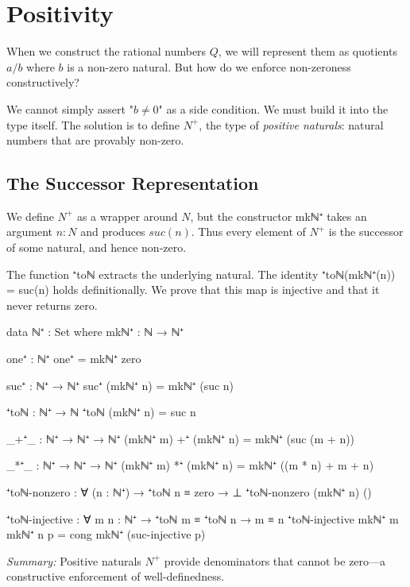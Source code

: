 \documentclass[11pt,a4paper]{book}
\def\mathrm#1{#1}%
\def\mathbb#1{#1}%
\def\texttt#1{#1}%
\begin{document}
\chapter{Positivity}

When we construct the rational numbers $\mathbb{Q}$, we will represent them as 
quotients $a/b$ where $b$ is a non-zero natural. But how do we enforce non-zeroness 
constructively?

We cannot simply assert "$b \ne 0$" as a side condition. We must build it into the 
type itself. The solution is to define $\mathbb{N}^+$, the type of \emph{positive naturals}: 
natural numbers that are provably non-zero.

\section{The Successor Representation}

We define $\mathbb{N}^+$ as a wrapper around $\mathbb{N}$, but the constructor \texttt{mkℕ⁺} 
takes an argument $n : \mathbb{N}$ and produces $\mathrm{suc}(n)$. Thus every element 
of $\mathbb{N}^+$ is the successor of some natural, and hence non-zero.

The function \texttt{⁺toℕ} extracts the underlying natural. The identity \texttt{⁺toℕ(mkℕ⁺(n)) = suc(n)} 
holds definitionally. We prove that this map is injective and that it never returns zero.

\begin{code}
data ℕ⁺ : Set where
  mkℕ⁺ : ℕ → ℕ⁺

one⁺ : ℕ⁺
one⁺ = mkℕ⁺ zero

suc⁺ : ℕ⁺ → ℕ⁺
suc⁺ (mkℕ⁺ n) = mkℕ⁺ (suc n)

⁺toℕ : ℕ⁺ → ℕ
⁺toℕ (mkℕ⁺ n) = suc n

_+⁺_ : ℕ⁺ → ℕ⁺ → ℕ⁺
(mkℕ⁺ m) +⁺ (mkℕ⁺ n) = mkℕ⁺ (suc (m + n))

_*⁺_ : ℕ⁺ → ℕ⁺ → ℕ⁺
(mkℕ⁺ m) *⁺ (mkℕ⁺ n) = mkℕ⁺ ((m * n) + m + n)
\end{code}
\begin{code}
⁺toℕ-nonzero : ∀ (n : ℕ⁺) → ⁺toℕ n ≡ zero → ⊥
⁺toℕ-nonzero (mkℕ⁺ n) ()

⁺toℕ-injective : ∀ {m n : ℕ⁺} → ⁺toℕ m ≡ ⁺toℕ n → m ≡ n
⁺toℕ-injective {mkℕ⁺ m} {mkℕ⁺ n} p = cong mkℕ⁺ (suc-injective p)
\end{code}

\medskip
\noindent\textit{Summary:} Positive naturals $\mathbb{N}^+$ provide denominators that cannot be zero—a constructive enforcement of well-definedness.
\end{document}
